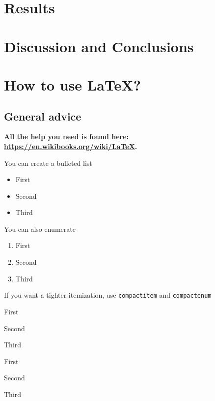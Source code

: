 \documentclass{amsart}
\begin{document}
\section{Results}

\section{Discussion and Conclusions}


\clearpage \appendix

\section{How to use LaTeX?}

\subsection{General advice}

\textbf{  All the help you need is found here: \url{https://en.wikibooks.org/wiki/LaTeX}. }

You can create a bulleted list
\begin{itemize}
\item First
\item Second
\item Third
\end{itemize}

You can also enumerate
\begin{enumerate}
\item First
\item Second
\item Third
\end{enumerate}

If you want a tighter itemization, use \verb|compactitem| and \verb|compactenum|
\begin{compactitem}
\item First
\item Second
\item Third
\end{compactitem}

\begin{compactenum}
\item First
\item Second
\item Third
\end{compactenum}
\end{document}
